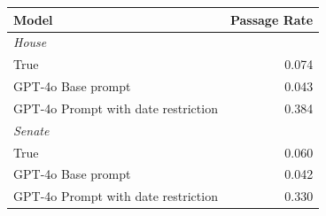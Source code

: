 
\begin{tabular}{lr}
\toprule
Model & Passage Rate\\
\midrule
\multicolumn{2}{l}{\textit{House}}\\
\hspace{1em}True & 0.074\\
\hspace{1em}GPT-4o Base prompt & 0.043\\
\hspace{1em}GPT-4o Prompt with date restriction & 0.384\\
\midrule
\multicolumn{2}{l}{\textit{Senate}}\\
\hspace{1em}True & 0.060\\
\hspace{1em}GPT-4o Base prompt & 0.042\\
\hspace{1em}GPT-4o Prompt with date restriction & 0.330\\
\bottomrule
\end{tabular}
